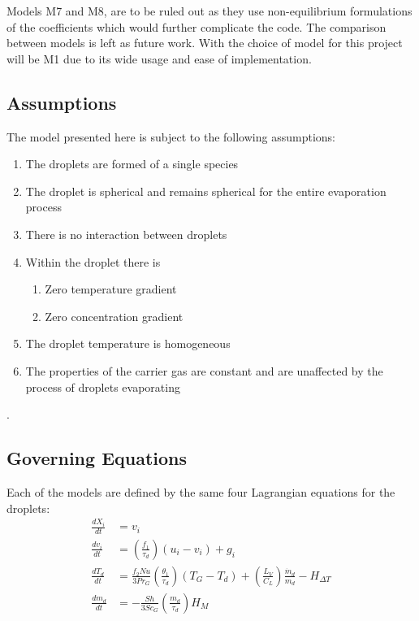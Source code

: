 \documentclass[../Interim_Report_Master]{subfiles}
\begin{document}
Models M7 and M8, are to be ruled out as they use non-equilibrium formulations of the coefficients which would further complicate the code. The comparison between models is left as future work. With the choice of model for this project will be M1 due to its wide usage and ease of implementation.

\subsection{Assumptions}
The model presented here is subject to the following assumptions:
\begin{enumerate}
	\item The droplets are formed of a single species
	\item The droplet is spherical and remains spherical for the entire evaporation process
	\item There is no interaction between droplets
	\item Within the droplet there is 
		\begin{enumerate}
			\item Zero temperature gradient
			\item Zero concentration gradient
		\end{enumerate}
	\item The droplet temperature is homogeneous
	\item The properties of the carrier gas are constant and are unaffected by the process of droplets evaporating
\end{enumerate}

\cite{Miller1998}\cite{arnold2000}.

\subsection{Governing Equations}
Each of the models are defined by the same four Lagrangian equations for the droplets:
\begin{align}
\frac{dX_{i}}{dt} &= v_{i} 
\label{vel} \\
\frac{dv_{i}}{dt} &= \left(\frac{f_{1}}{\tau_{d}}\right)(u_{i}-v_{i}) + g_i 
\label{accel} \\
\frac{dT_{d}}{dt} &= \frac{f_{2}Nu}{3Pr_{G}}\left(\frac{\theta_1}{\tau_d}\right)(T_{G}-T_{d}) + \left(\frac{L_{V}}{C_{L}}\right)\frac{\dot{m}_{d}}{m_{d}} - H_{\Delta T} 
\label{temp} \\
\frac{dm_{d}}{dt} &= -\frac{Sh}{3Sc_{G}}\left(\frac{m_{d}}{\tau_{d}}\right)H_M
\label{mass}
\end{align}
\end{document}
